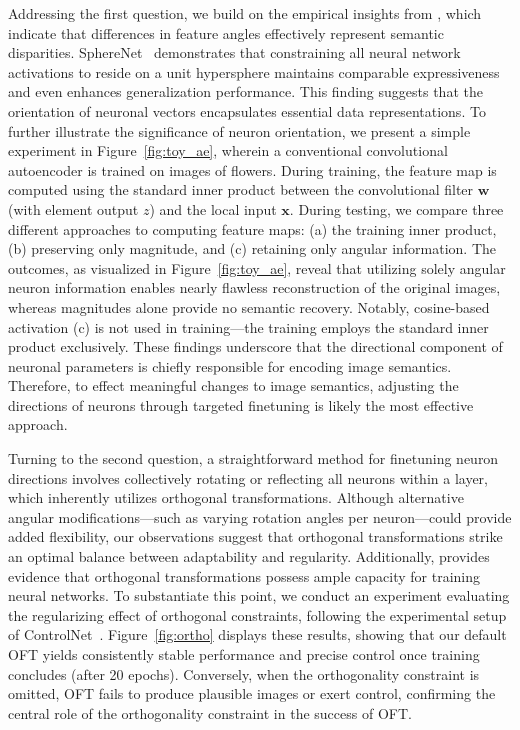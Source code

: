 Addressing the first question, we build on the empirical insights from \cite{liu2018decoupled,chen2020angular}, which indicate that differences in feature angles effectively represent semantic disparities. SphereNet~\cite{liu2017deep} demonstrates that constraining all neural network activations to reside on a unit hypersphere maintains comparable expressiveness and even enhances generalization performance. This finding suggests that the orientation of neuronal vectors encapsulates essential data representations. To further illustrate the significance of neuron orientation, we present a simple experiment in Figure~\ref{fig:toy_ae}, wherein a conventional convolutional autoencoder is trained on images of flowers. During training, the feature map is computed using the standard inner product between the convolutional filter $\bm{w}$ (with element output $z$) and the local input $\bm{x}$. During testing, we compare three different approaches to computing feature maps: (a) the training inner product, (b) preserving only magnitude, and (c) retaining only angular information. The outcomes, as visualized in Figure~\ref{fig:toy_ae}, reveal that utilizing solely angular neuron information enables nearly flawless reconstruction of the original images, whereas magnitudes alone provide no semantic recovery. Notably, cosine-based activation (c) is not used in training—the training employs the standard inner product exclusively. These findings underscore that the directional component of neuronal parameters is chiefly responsible for encoding image semantics. Therefore, to effect meaningful changes to image semantics, adjusting the directions of neurons through targeted finetuning is likely the most effective approach.

Turning to the second question, a straightforward method for finetuning neuron directions involves collectively rotating or reflecting all neurons within a layer, which inherently utilizes orthogonal transformations. Although alternative angular modifications—such as varying rotation angles per neuron—could provide added flexibility, our observations suggest that orthogonal transformations strike an optimal balance between adaptability and regularity. Additionally, \cite{liu2021orthogonal} provides evidence that orthogonal transformations possess ample capacity for training neural networks. To substantiate this point, we conduct an experiment evaluating the regularizing effect of orthogonal constraints, following the experimental setup of ControlNet~\cite{zhang2023adding}. Figure~\ref{fig:ortho} displays these results, showing that our default OFT yields consistently stable performance and precise control once training concludes (after 20 epochs). Conversely, when the orthogonality constraint is omitted, OFT fails to produce plausible images or exert control, confirming the central role of the orthogonality constraint in the success of OFT.

